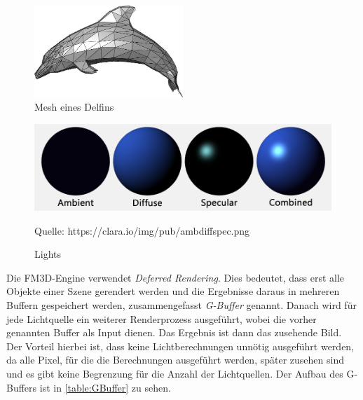 \begin{figure}
	\begin{center}
		\includegraphics[width=0.5\textwidth]{06anhang/bilder/delphin.jpg}
		\caption{Mesh eines Delfins}
		\label{Dolphin}
	\end{center}
\end{figure}
\begin{figure}
	\centering
	\includegraphics[scale=0.4]{02theorie/amb_diff_spec.png}
		
	Quelle: https://clara.io/img/pub/amb\textunderscore diff\textunderscore spec.png
	\caption{Lights}\label{Img:Lights}
\end{figure}

Die FM3D-Engine verwendet \textit{Deferred Rendering}. Dies bedeutet, dass erst alle Objekte einer Szene gerendert werden und die Ergebnisse daraus in mehreren Buffern gespeichert werden, zusammengefasst \textit{G-Buffer} genannt. Danach wird für jede Lichtquelle ein weiterer Renderprozess ausgeführt, wobei die vorher genannten Buffer als Input dienen. Das Ergebnis ist dann das zusehende Bild. Der Vorteil hierbei ist, dass keine Lichtberechnungen unnötig ausgeführt werden, da alle Pixel, für die die Berechnungen ausgeführt werden, später zusehen sind und es gibt keine Begrenzung für die Anzahl der Lichtquellen. Der Aufbau des G-Buffers ist in \cref{table:GBuffer} zu sehen.

